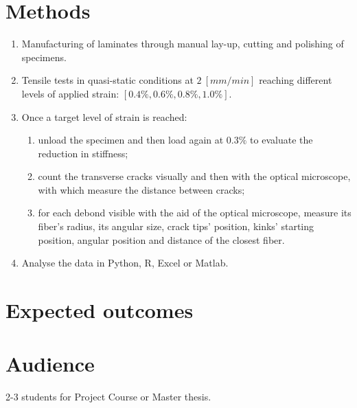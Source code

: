 \documentclass[review]{elsarticle}
\begin{document}
\section{Methods}
\begin{enumerate}
\item Manufacturing of laminates through manual lay-up, cutting and polishing of specimens.
\item Tensile tests in quasi-static conditions at $2\ \left[mm/min\right]$ reaching different levels of applied strain: $\left[0.4\%, 0.6\%, 0.8\%, 1.0\%\right]$.
\item Once a target level of strain is reached:
\begin{enumerate}[label=\alph*]
\item unload the specimen and then load again at $0.3\%$ to evaluate the reduction in stiffness;
\item count the transverse cracks visually and then with the optical microscope, with which measure the distance between cracks;
\item for each debond visible with the aid of the optical microscope, measure its fiber's radius, its angular size, crack tips' position, kinks' starting position, angular position and distance of the closest fiber.
\end{enumerate}
\item Analyse the data in Python, R, Excel or Matlab.
\end{enumerate}

\section{Expected outcomes}

\section{Audience}
2-3 students for Project Course or Master thesis.



\end{document}
